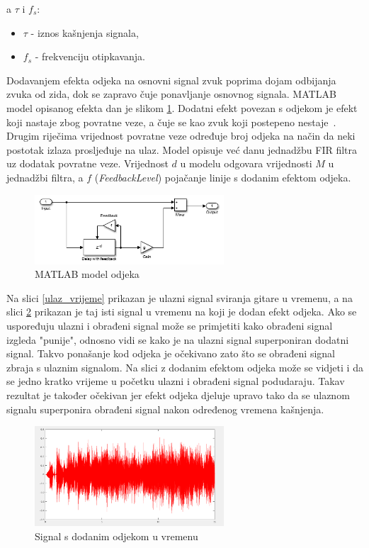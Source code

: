 \documentclass[conference]{IEEEtran}
\begin{document}
a $\tau$ i $f_{s}$:
 \begin{itemize}
   \item{$\tau$ - iznos kašnjenja signala,}
   \item{$f_{s}$ - frekvenciju otipkavanja.}
 \end{itemize}
Dodavanjem efekta odjeka na osnovni signal zvuk poprima dojam odbijanja zvuka od zida, dok se zapravo čuje
ponavljanje osnovnog signala. MATLAB model opisanog efekta dan je slikom \ref{echo_model}. Dodatni efekt povezan
s odjekom je efekt koji nastaje zbog povratne veze, a čuje se kao zvuk koji postepeno nestaje~\cite{b4}. Drugim riječima
vrijednost povratne veze određuje broj odjeka na način da neki postotak izlaza prosljeđuje na ulaz.
Model opisuje već danu jednadžbu FIR filtra uz dodatak povratne veze. Vrijednost $d$ u modelu odgovara vrijednosti
$M$ u jednadžbi filtra, a $f$ (\textit{FeedbackLevel}) pojačanje linije s dodanim efektom odjeka.

\begin{figure}[H]
    \includegraphics[width=200pt]{slike/echo_matlab.png}
    \centering
    \caption{MATLAB model odjeka}
    \label{echo_model}
\end{figure}

Na slici \ref{ulaz_vrijeme} prikazan je ulazni signal sviranja gitare u vremenu, a na slici \ref{echo_vrijeme} prikazan
je taj isti signal
u vremenu na koji je dodan efekt odjeka. Ako se uspoređuju ulazni i obrađeni signal može se primjetiti
kako obrađeni signal izgleda "punije", odnosno vidi se kako je na ulazni signal superponiran dodatni signal.
Takvo ponašanje kod odjeka je očekivano zato što se obrađeni signal zbraja s ulaznim signalom. Na slici z dodanim
efektom odjeka može se vidjeti i da se jedno kratko vrijeme u početku ulazni i obrađeni signal podudaraju. Takav rezultat
je također očekivan jer efekt odjeka djeluje upravo tako da se ulaznom signalu superponira obrađeni signal nakon određenog
vremena kašnjenja.

\begin{figure}[H]
    \includegraphics[width=200pt]{slike/echo_vrijeme.png}
    \centering
    \caption{Signal s dodanim odjekom u vremenu}
    \label{echo_vrijeme}
\end{figure}
\end{document}
